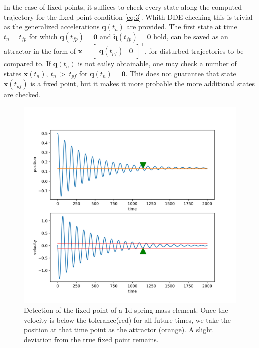 In the case of fixed points, it suffices to check every state along the computed trajectory for the fixed point condition \ref{eq:3}. Whith DDE checking this is trivial as the generalized accelerations $\ddot{\mathbf{q}}(t_n)$ are provided. 
The first state at time $t_n = t_{fp}$ for which $\dot{\mathbf{q}}(t_{fp}) = \mathbf{0}$ and $\ddot{\mathbf{q}}(t_{fp}) = \mathbf{0}$ hold, can be saved as an attractor in the form of $\mathbf{x} = \begin{bmatrix}\mathbf{q}(t_{pf})&\mathbf{0}\end{bmatrix}^\intercal$, for disturbed trajectories to be compared to. 
If $\ddot{\mathbf{q}}(t_n)$ is not eailsy obtainable, one may check a number of states $\mathbf{x}(t_n),\ t_n\ >\ t_{pf}$ for $\dot{\mathbf{q}}(t_n) = \mathbf{0}$. This does not guarantee that state $\mathbf{x}(t_{pf})$ is a fixed point, 
but it makes it more probable the more additional states are checked. 

\begin{figure}[h]
\centering
\includegraphics[width=.7\textwidth]{figures/fixed_point_detection.png}
\caption[Fixed Point Detection]{Detection of the fixed point of a 1d spring mass element. Once the velocity is below the tolerance(red) for all future times, we take the position at that time point as the attractor (orange). A slight deviation from the true fixed point remains.}
\label{fpdet}
\end{figure}

